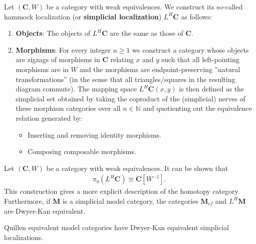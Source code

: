     \begin{construct}
        Let $(\mathbf{C},W)$ be a category with weak equivalences. We construct its so-called hammock localization (or \textbf{simplicial localization}) $L^H\mathbf{C}$ as follows:
        \begin{enumerate}
            \item \textbf{Objects}: The objects of $L^H\mathbf{C}$ are the same as those of $\mathbf{C}$.
            \item \textbf{Morphisms}: For every integer $n\geq1$ we construct a category whose objects are zigzags of morphisms in $\mathbf{C}$ relating $x$ and $y$ such that all left-pointing morphisms are in $W$ and the morphisms are endpoint-preserving ''natural transformations'' (in the sense that all triangles/squares in the resulting diagram commute). The mapping space $L^H\mathbf{C}(x, y)$ is then defined as the simplicial set obtained by taking the coproduct of the (simplicial) nerves of these morphism categories over all $n\in\mathbb{N}$ and quotienting out the equivalence relation generated by:
            \begin{itemize}
                \item Inserting and removing identity morphisms.
                \item Composing composable morphisms.
            \end{itemize}
        \end{enumerate}
    \end{construct}

    \begin{property}
        Let $(\mathbf{C},W)$ be a category with weak equivalences. It can be shown that
        \begin{gather}
            \pi_0(L^H\mathbf{C}) \cong \mathbf{C}[W^{-1}].
        \end{gather}
        This construction gives a more explicit description of the homotopy category. Furthermore, if $\mathbf{M}$ is a simplicial model category, the categories $\mathbf{M}_{cf}$ and $L^H\mathbf{M}$ are Dwyer-Kan equivalent.
    \end{property}
    \begin{property}
        Quillen equivalent model categories have Dwyer-Kan equivalent simplicial localizations.
    \end{property}


